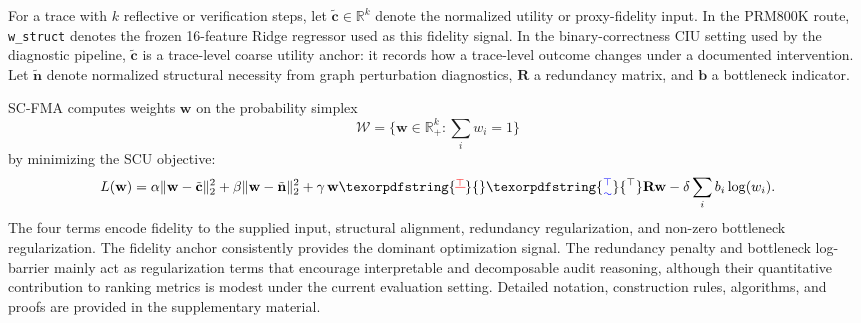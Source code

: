 \documentclass[a4paper,fleqn]{cas-sc}
\makeatletter
\providecommand{\DIFaddtex}[1]{{\protect\color{blue}\uwave{#1}}} %
\providecommand{\DIFdeltex}[1]{{\protect\color{red}\sout{#1}}} %
\providecommand{\DIFaddbegin}{} %
\providecommand{\DIFaddend}{} %
\providecommand{\DIFdelbegin}{} %
\providecommand{\DIFdelend}{} %
\providecommand{\DIFadd}[1]{\texorpdfstring{\DIFaddtex{#1}}{#1}} %
\providecommand{\DIFdel}[1]{\texorpdfstring{\DIFdeltex{#1}}{}} %
\providecommand{\DIFscaledelfig}{0.5}
\newlength{\DIFdelgraphicswidth} %
\newlength{\DIFdelgraphicsheight} %
\providecommand{\DIFaddincludegraphics}[2][]{{\color{blue}\fbox{\DIFOincludegraphics[#1]{#2}}}} %
\providecommand{\DIFdelincludegraphics}[2][]{%
\sbox{\DIFdelgraphicsbox}{\DIFOincludegraphics[#1]{#2}}%
\settoboxwidth{\DIFdelgraphicswidth}{\DIFdelgraphicsbox} %
\settoboxtotalheight{\DIFdelgraphicsheight}{\DIFdelgraphicsbox} %
\scalebox{\DIFscaledelfig}{%
\parbox[b]{\DIFdelgraphicswidth}{\usebox{\DIFdelgraphicsbox}\\[-\baselineskip] \rule{\DIFdelgraphicswidth}{0em}}\llap{\resizebox{\DIFdelgraphicswidth}{\DIFdelgraphicsheight}{%
\setlength{\unitlength}{\DIFdelgraphicswidth}%
\begin{picture}(1,1)%
\thicklines\linethickness{2pt} %
{\color[rgb]{1,0,0}\put(0,0){\framebox(1,1){}}}%
{\color[rgb]{1,0,0}\put(0,0){\line( 1,1){1}}}%
{\color[rgb]{1,0,0}\put(0,1){\line(1,-1){1}}}%
\end{picture}%
}\hspace*{3pt}}} %
} %
\DeclareRobustCommand{\DIFaddbegin}{\DIFOaddbegin \let\includegraphics\DIFaddincludegraphics} %
\DeclareRobustCommand{\DIFaddend}{\DIFOaddend \let\includegraphics\DIFOincludegraphics} %
\DeclareRobustCommand{\DIFdelbegin}{\DIFOdelbegin \let\includegraphics\DIFdelincludegraphics} %
\DeclareRobustCommand{\DIFdelend}{\DIFOaddend \let\includegraphics\DIFOincludegraphics} %
\let\sout@orig\sout %
\renewcommand{\sout}[1]{\ifmmode\text{\sout@orig{\ensuremath{#1}}}\else\sout@orig{#1}\fi} %
\makeatother
\begin{document}
For a trace with $k$ reflective or verification steps, let $\tilde{\mathbf{c}}\in\mathbb{R}^k$ denote the normalized utility or proxy-fidelity input. In the PRM800K route, \texttt{w\_struct} denotes the frozen 16-feature Ridge regressor used as this fidelity signal. In the binary-correctness CIU setting used by the diagnostic pipeline, $\tilde{\mathbf{c}}$ is a trace-level coarse utility anchor: it records how a trace-level outcome changes under a documented intervention. Let $\tilde{\mathbf{n}}$ denote normalized structural necessity from graph perturbation diagnostics, $\mathbf{R}$ a redundancy matrix, and $\mathbf{b}$ a bottleneck indicator.

SC-FMA computes weights $\mathbf{w}$ on the probability simplex
\[
\mathcal{W}=\{\mathbf{w}\in\mathbb{R}_{+}^{k}: \sum_i w_i = 1\}
\]
by minimizing the SCU objective:
\begin{equation}
L(\mathbf{w}) =
\alpha\|\mathbf{w} - \tilde{\mathbf{c}}\|_2^2
+ \beta\|\mathbf{w} - \tilde{\mathbf{n}}\|_2^2
+ \gamma\,\mathbf{w}\DIFdelbegin \DIFdel{^{\top}}\DIFdelend \DIFaddbegin \DIFadd{^\top }\DIFaddend \mathbf{R} \mathbf{w}
- \delta\sum_i b_i \log(w_i).
\label{eq:scu}
\end{equation}
The four terms encode fidelity to the supplied input, structural alignment, redundancy regularization, and non-zero bottleneck regularization. The fidelity anchor consistently provides the dominant optimization signal. The redundancy penalty and bottleneck log-barrier mainly act as regularization terms that encourage interpretable and decomposable audit reasoning, although their quantitative contribution to ranking metrics is modest under the current evaluation setting. Detailed notation, construction rules, algorithms, and proofs are provided in the supplementary material.
\end{document}
